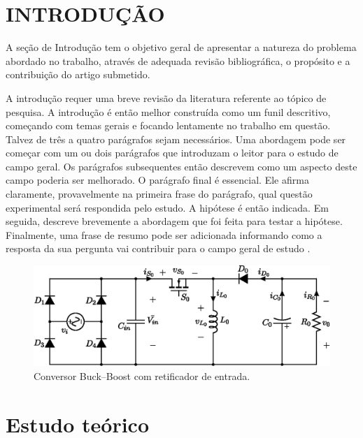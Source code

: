 %


\section{INTRODUÇÃO}


A seção de Introdução tem o objetivo geral de apresentar a natureza do problema abordado no trabalho, através de adequada revisão bibliográfica, o propósito e a contribuição do artigo submetido.

A introdução requer uma breve revisão da literatura referente ao tópico de pesquisa. A introdução é então melhor construída como um funil descritivo, começando com temas gerais e focando lentamente no trabalho em questão. Talvez de três a quatro parágrafos sejam necessários. Uma abordagem pode ser começar com um ou dois parágrafos que introduzam o leitor para o estudo de campo geral. Os parágrafos subsequentes então descrevem como um aspecto deste campo poderia ser melhorado. O parágrafo final é essencial. Ele afirma claramente, provavelmente na primeira frase do parágrafo, qual questão experimental será respondida pelo estudo. A hipótese é então indicada. Em seguida, descreve brevemente a abordagem que foi feita para testar a hipótese. Finalmente, uma frase de resumo pode ser adicionada informando como a resposta da sua pergunta vai contribuir para o campo geral de estudo .

\begin{figure}[!h]
	\centering
	\includegraphics[width=1\linewidth]{Figs/RET-BuckBoost}
	\caption{Conversor Buck--Boost com retificador de entrada.}
	\label{fig:ret-buckboost}
\end{figure}



\section{Estudo teórico}

